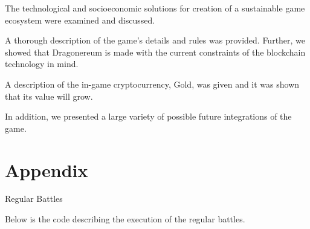 \documentclass[12pt]{article}
\begin{document}
The technological and socioeconomic solutions for creation of a sustainable game ecosystem were examined and discussed.\par

A thorough description of the game’s details and rules was provided. Further, we showed that Dragonereum is made with the current constraints of the blockchain technology in mind.\par

A description of the in-game cryptocurrency, Gold, was given and it was shown that its value will grow.  \par

In addition, we presented a large variety of possible future integrations of the game.\par

\vspace{\baselineskip}

 

\newpage
\printbibliography

\newpage
\section*{Appendix}


  \begin{Large}
  {Regular Battles}%
  \end{Large}


\vspace{\baselineskip}
Below is the code describing the execution of the regular battles.\par
\end{document}
